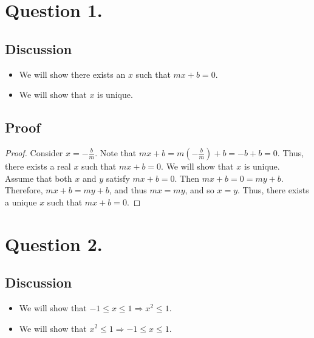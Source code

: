 \documentclass{article}
\begin{document}
    \section*{Question 1.}
    \subsection*{Discussion}
    \begin{itemize}
        \item We will show there exists an $ x $ such that $ mx + b = 0 $.
        \item We will show that $ x $ is unique.
    \end{itemize}
    
    \subsection*{Proof}
    \begin{proof}
        Consider $ x = -\frac{b}{m} $. Note that $ mx + b = m(-\frac{b}{m}) + b = -b + b = 0 $. Thus, there exists a real $ x $ such that $ mx + b = 0 $.
        We will show that $ x $ is unique. Assume that both $ x $ and $ y $ satisfy $ mx + b = 0 $. Then $ mx + b = 0 = my + b $.
        Therefore, $ mx + b = my + b $, and thus $ mx = my $, and so $ x = y $. Thus, there exists a unique $ x $ such that $ mx + b = 0 $.
    \end{proof}

    \section*{Question 2.}
    \subsection*{Discussion}
    \begin{itemize}
        \item We will show that $ -1 \le x \le 1 \Rightarrow x^2 \le 1 $.
        \item We will show that $ x^2 \le 1 \Rightarrow -1 \le x \le 1 $.
    \end{itemize}
    
\end{document}

